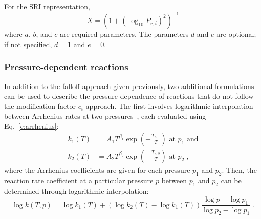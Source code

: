 \documentclass[preprint,12pt]{elsarticle}
\begin{document}
For the SRI representation,
\begin{equation}
X = \left( 1 + \left( \log_{10} P_{r,i} \right)^2 \right)^{-1}
\end{equation}
where $a$, $b$, and $c$ are required parameters. The parameters $d$ and $e$ are optional; if not specified, $d = 1$ and $e = 0$.

\subsubsection{Pressure-dependent reactions}

In addition to the falloff approach given previously, two additional formulations can be used to describe the pressure dependence of reactions that do not follow the modification factor $c_i$ approach.
The first involves logarithmic interpolation between Arrhenius rates at two pressures~\cite{chemkin:2012,Goodwin:2014aa}, each evaluated using Eq.~\eqref{e:arrhenius}:
\begin{align}
k_1 (T) &= A_1 T^{\beta_1} \exp \left( -\frac{T_{a, 1}}{T} \right) \text{ at } p_1 \text{ and} \label{e:plog_k1} \\
k_2 (T) &= A_2 T^{\beta_2} \exp \left( -\frac{T_{a, 2}}{T} \right) \text{ at } p_2 \;, \label{e:plog_k2}
\end{align}
where the Arrhenius coefficients are given for each pressure $p_1$ and $p_2$.
Then, the reaction rate coefficient at a particular pressure $p$ between $p_1$ and $p_2$ can be determined through logarithmic interpolation:
\begin{equation}
\log k(T, p) = \log k_1 (T) + \left( \log k_2 (T) - \log k_1 (T) \right) \frac{\log p - \log p_1}{\log p_2 - \log p_1} \;. \label{e:plog}
\end{equation}
\end{document}
